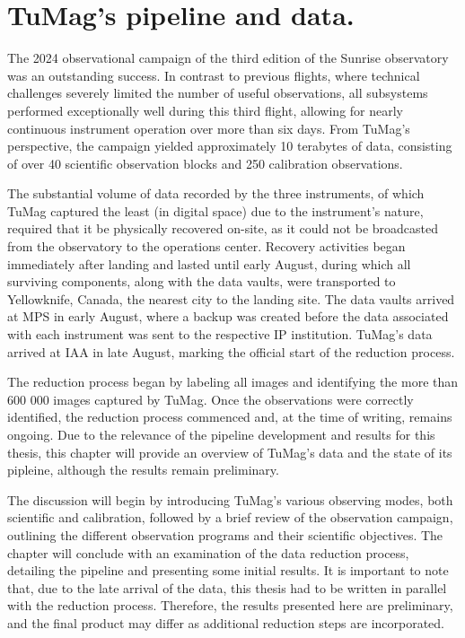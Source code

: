 \chapter{\label{CH:Pipeline}TuMag's pipeline and data.}


The 2024 observational campaign of the third edition of the Sunrise observatory was an outstanding success. In contrast to previous flights, where technical challenges severely limited the number of useful observations, all subsystems performed exceptionally well during this third flight, allowing for nearly continuous instrument operation over more than six days. From TuMag’s perspective, the campaign yielded approximately 10 terabytes of data, consisting of over 40 scientific observation blocks and 250 calibration observations.

The substantial volume of data recorded by the three instruments, of which TuMag captured the least (in digital space) due to the instrument’s nature, required that it be physically recovered on-site, as it could not be broadcasted from the observatory to the operations center. Recovery activities began immediately after landing and lasted until early August, during which all surviving components, along with the data vaults, were transported to Yellowknife, Canada, the nearest city to the landing site. The data vaults arrived at MPS in early August, where a backup was created before the data associated with each instrument was sent to the respective IP institution. TuMag’s data arrived at  IAA in late August, marking the official start of the reduction process.

The reduction process began by labeling all images and identifying the more than 600 000 images captured by TuMag. Once the observations were correctly identified, the reduction process commenced and, at the time of writing, remains ongoing. Due to the relevance of the pipeline development and results for this thesis, this chapter will provide an overview of TuMag's data and the state of its pipleine, although the results remain preliminary.

The discussion will begin by introducing TuMag’s various observing modes, both scientific and calibration, followed by a brief review of the observation campaign, outlining the different observation programs and their scientific objectives. The chapter will conclude with an examination of the data reduction process, detailing the pipeline and presenting some initial results. It is important to note that, due to the late arrival of the data, this thesis had to be written in parallel with the reduction process. Therefore, the results presented here are preliminary, and the final product may differ as additional reduction steps are incorporated.

